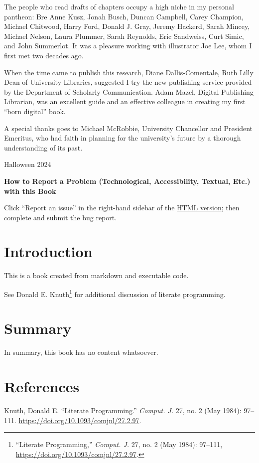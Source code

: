 \documentclass[
  letterpaper,
]{scrbook}
\newlength{\cslhangindent}
\newenvironment{CSLReferences}[2] %
 {\begin{list}{}{%
  \setlength{\itemindent}{0pt}
  \setlength{\leftmargin}{0pt}
  \setlength{\parsep}{0pt}
  \ifodd #1
   \setlength{\leftmargin}{\cslhangindent}
   \setlength{\itemindent}{-1\cslhangindent}
  \fi
  \setlength{\itemsep}{#2\baselineskip}}}
 {\end{list}}
\begin{document}
The people who read drafts of chapters occupy a high niche in my
personal pantheon: Bre Anne Kusz, Jonah Busch, Duncan Campbell, Carey
Champion, Michael Chitwood, Harry Ford, Donald J. Gray, Jeremy Hackerd,
Sarah Mincey, Michael Nelson, Laura Plummer, Sarah Reynolds, Eric
Sandweiss, Curt Simic, and John Summerlot. It was a pleasure working
with illustrator Joe Lee, whom I first met two decades ago.

When the time came to publish this research, Diane Dallis-Comentale,
Ruth Lilly Dean of University Libraries, suggested I try the new
publishing service provided by the Department of Scholarly
Communication. Adam Mazel, Digital Publishing Librarian, was an
excellent guide and an effective colleague in creating my first ``born
digital'' book.

A special thanks goes to Michael McRobbie, University Chancellor and
President Emeritus, who had faith in planning for the university's
future by a thorough understanding of its past.

Halloween 2024

\textbf{How to Report a Problem (Technological, Accessibility, Textual,
Etc.) with this Book}

Click ``Report an issue'' in the right-hand sidebar of the \href{}{HTML
version}; then complete and submit the bug report.


\chapter{Introduction}\label{introduction}

This is a book created from markdown and executable code.

See Donald E. Knuth\footnote{{``Literate Programming,''} \emph{Comput.
  J.} 27, no. 2 (May 1984): 97--111,
  \url{https://doi.org/10.1093/comjnl/27.2.97}.} for additional
discussion of literate programming.


\chapter{Summary}\label{summary}

In summary, this book has no content whatsoever.


\chapter*{References}\label{references}


\label{refs}
\begin{CSLReferences}{1}{0}
Knuth, Donald E. {``Literate Programming.''} \emph{Comput. J.} 27, no. 2
(May 1984): 97--111. \url{https://doi.org/10.1093/comjnl/27.2.97}.

\end{CSLReferences}


\backmatter
\end{document}
